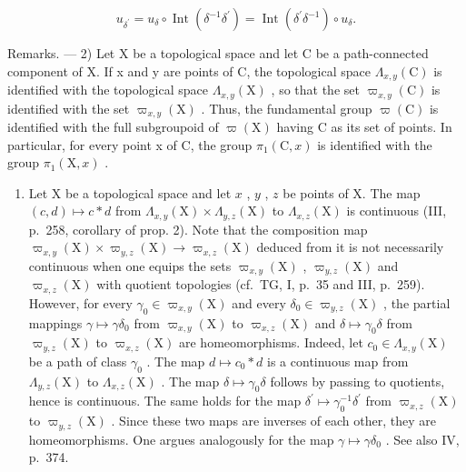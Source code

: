 \[
u _ {\delta^ {\prime}} = u _ {\delta} \circ \operatorname{Int} (\delta^ {- 1} \delta^ {\prime}) = \operatorname{Int} (\delta^ {\prime} \delta^ {- 1}) \circ u _ {\delta}.\tag{7}
\]

Remarks. --- 2) Let X be a topological space and let C be a path-connected component of X. If x and y are points of C, the topological space \(\Lambda_{x,y}(\mathrm{C})\) is identified with the topological space \(\Lambda_{x,y}(\mathrm{X})\) , so that the set \(\varpi_{x,y}(\mathrm{C})\) is identified with the set \(\varpi_{x,y}(\mathrm{X})\) . Thus, the fundamental group \(\varpi(\mathrm{C})\) is identified with the full subgroupoid of \(\varpi(\mathrm{X})\) having C as its set of points. In particular, for every point x of C, the group \(\pi_1(\mathrm{C}, x)\) is identified with the group \(\pi_1(\mathrm{X}, x)\) .

\begin{enumerate}
\def\labelenumi{\arabic{enumi})}
\setcounter{enumi}{2}
\tightlist
\item
  Let X be a topological space and let \(x\) , \(y\) , \(z\) be points of X. The map \((c,d)\mapsto c*d\) from \(\Lambda_{x,y}(\mathrm{X})\times \Lambda_{y,z}(\mathrm{X})\) to \(\Lambda_{x,z}(\mathrm{X})\) is continuous (III, p.~258, corollary of prop. 2). Note that the composition map \(\varpi_{x,y}(\mathrm{X})\times \varpi_{y,z}(\mathrm{X})\to \varpi_{x,z}(\mathrm{X})\) deduced from it is not necessarily continuous when one equips the sets \(\varpi_{x,y}(\mathrm{X})\) , \(\varpi_{y,z}(\mathrm{X})\) and \(\varpi_{x,z}(\mathrm{X})\) with quotient topologies (cf.~TG, I, p.~35 and III, p.~259). However, for every \(\gamma_0\in \varpi_{x,y}(\mathrm{X})\) and every \(\delta_0\in \varpi_{y,z}(\mathrm{X})\) , the partial mappings \(\gamma \mapsto \gamma \delta_0\) from \(\varpi_{x,y}(\mathrm{X})\) to \(\varpi_{x,z}(\mathrm{X})\) and \(\delta \mapsto \gamma_0\delta\) from \(\varpi_{y,z}(\mathrm{X})\) to \(\varpi_{x,z}(\mathrm{X})\) are homeomorphisms. Indeed, let \(c_0\in \Lambda_{x,y}(\mathrm{X})\) be a path of class \(\gamma_0\) . The map \(d\mapsto c_0*d\) is a continuous map from \(\Lambda_{y,z}(\mathrm{X})\) to \(\Lambda_{x,z}(\mathrm{X})\) . The map \(\delta \mapsto \gamma_0\delta\) follows by passing to quotients, hence is continuous. The same holds for the map \(\delta^{\prime}\mapsto \gamma_{0}^{-1}\delta^{\prime}\) from \(\varpi_{x,z}(\mathrm{X})\) to \(\varpi_{y,z}(\mathrm{X})\) . Since these two maps are inverses of each other, they are homeomorphisms. One argues analogously for the map \(\gamma \mapsto \gamma \delta_0\) . See also IV, p.~374.
\end{enumerate}


